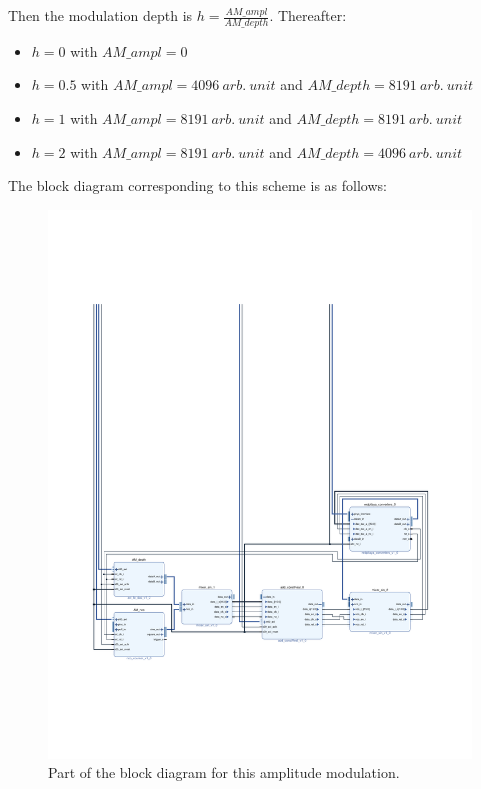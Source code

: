 \documentclass[12pt,oneside]{article}
\begin{document}
Then the modulation depth is $h=\frac{AM\_ampl}{AM\_depth}$. Thereafter:
\vspace{-0.1cm}
\begin{itemize}
	\setlength\itemsep{-0.2cm}
	\item $h=0$ with $AM\_ampl=0$ 
	\item $h=0.5$ with $AM\_ampl=4096~arb.~unit$ and $AM\_depth=8191~arb.~unit$
	\item $h=1$ with $AM\_ampl=8191~arb.~unit$ and $AM\_depth=8191~arb.~unit$
	\item $h=2$ with $AM\_ampl=8191~arb.~unit$ and $AM\_depth=4096~arb.~unit$
\end{itemize}The block diagram corresponding to this scheme is as follows:\newpage

\begin{figure}[h!tb]
	\begin{center}
		\includegraphics[width=14cm,trim={2cm 5cm 2cm 14cm}, clip]{design/mod_ampl1.pdf}
		\caption{Part of the block diagram for this amplitude modulation.}
		\label{fig:mod_ampl1}
	\end{center}
\end{figure}
\end{document}
